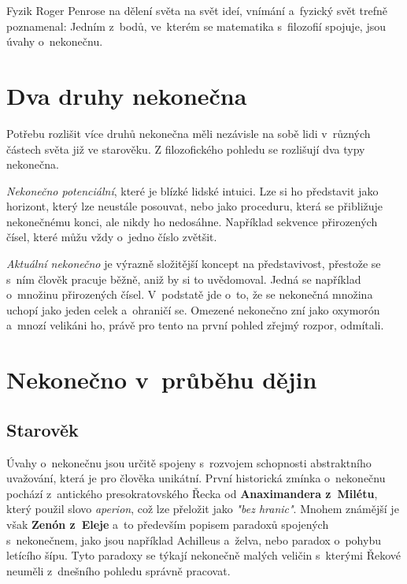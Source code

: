 \documentclass[czech]{article}
\begin{document}
Fyzik Roger Penrose na dělení světa na svět ideí, vnímání a~fyzický svět trefně poznamenal:
\cite{livio}
Jedním z~bodů, ve~kterém se matematika s~filozofií spojuje, jsou úvahy o~nekonečnu.


\section*{Dva druhy nekonečna}

Potřebu rozlišit více druhů nekonečna měli nezávisle na sobě lidi v~různých částech světa již ve starověku.
Z filozofického pohledu se rozlišují dva typy nekonečna. 

\textit{Nekonečno potenciální}, které je blízké lidské intuici. Lze si ho představit jako horizont, který lze neustále posouvat, nebo jako proceduru, která se přibližuje nekonečnému konci, ale nikdy ho nedosáhne. Například sekvence přirozených čísel, které můžu vždy o~jedno číslo zvětšit.

\textit{Aktuální nekonečno} je výrazně složitější koncept na představivost, přestože se s~ním člověk pracuje běžně, aniž by si to uvědomoval. Jedná se například o~množinu přirozených čísel. V~podstatě jde o~to, že se nekonečná množina uchopí jako jeden celek a~ohraničí se. Omezené nekonečno zní jako oxymorón a~mnozí velikáni ho, právě pro tento na první pohled zřejmý rozpor, odmítali.

\section*{Nekonečno v~průběhu dějin}

\subsection*{Starověk}
Úvahy o~nekonečnu jsou určitě spojeny s~rozvojem schopnosti abstraktního uvažování, která je pro člověka unikátní. První historická zmínka o~nekonečnu pochází z~antického presokratovského Řecka od \textbf{Anaximandera z~Milétu}, který použil slovo \textit{aperion}, což lze přeložit jako \textit{"bez hranic"}. \cite{wallace}
Mnohem známější je však \textbf{Zenón z~Eleje} a~to především popisem paradoxů spojených s~nekonečnem, jako jsou například Achilleus a~želva, nebo paradox o~pohybu letícího šípu. Tyto paradoxy se týkají nekonečně malých veličin s~kterými Řekové neuměli z~dnešního pohledu správně pracovat.
\end{document}
